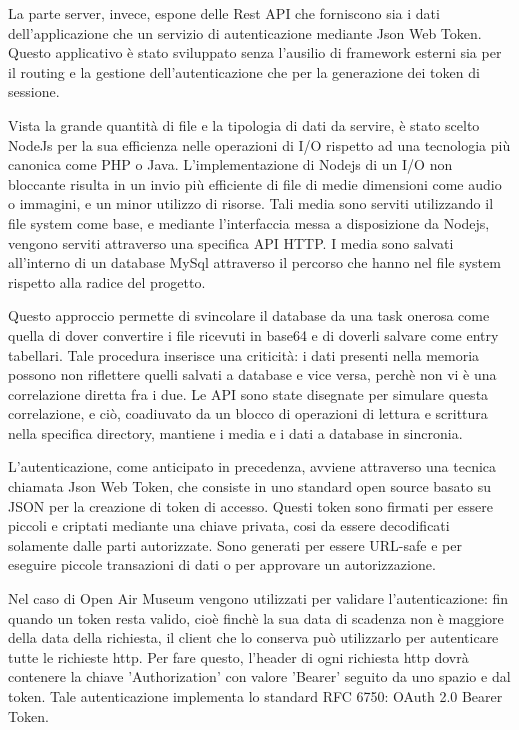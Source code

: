 La parte server, invece, espone delle Rest API che forniscono sia i dati dell'applicazione che un servizio di autenticazione mediante Json Web Token\cite{JWT}. Questo applicativo è stato sviluppato senza l’ausilio di framework esterni sia per il routing e la gestione dell’autenticazione che per la generazione dei token di sessione.\vspace{5mm}

 Vista la grande quantità di file e la tipologia di dati da servire, è stato scelto NodeJs per la sua efficienza nelle operazioni di I/O rispetto ad una tecnologia più canonica come PHP\cite{PHP} o Java\cite{Java}. L'implementazione di Nodejs di un I/O non bloccante\cite{BlockingVsNonBlocking} risulta in un invio più efficiente di file di medie dimensioni come audio o immagini, e un minor utilizzo di risorse. Tali media sono serviti utilizzando il file system come base, e mediante l'interfaccia messa a disposizione da Nodejs, vengono serviti attraverso una specifica API HTTP\cite{http}. I media sono salvati all'interno di un database MySql attraverso il percorso che hanno nel file system rispetto alla radice del progetto.\vspace{5mm}
 
  Questo approccio permette di svincolare il database da una task onerosa come quella di dover convertire i file ricevuti in base64 e di doverli salvare come entry tabellari. Tale procedura inserisce una criticità: i dati presenti nella memoria possono non riflettere quelli salvati a database e vice versa, perchè non vi è una correlazione diretta fra i due. Le API sono state disegnate per simulare questa correlazione, e ciò, coadiuvato da un blocco di operazioni di lettura e scrittura nella specifica directory, mantiene i media e i dati a database in sincronia. \vspace{5mm}

L'autenticazione, come anticipato in precedenza, avviene attraverso una tecnica chiamata Json Web Token\cite{JWT}, che consiste in uno standard open source basato su JSON per la creazione di token di accesso. Questi token sono firmati per essere piccoli e criptati mediante una chiave privata, cosi da essere decodificati solamente dalle parti autorizzate. Sono generati per essere URL-safe e per eseguire piccole transazioni di dati o per approvare un autorizzazione.  \vspace{5mm}

Nel caso di Open Air Museum vengono utilizzati per validare l'autenticazione: fin quando un token resta valido, cioè finchè la sua data di scadenza non è maggiore della data della richiesta, il client che lo conserva può utilizzarlo per autenticare tutte le richieste http. Per fare questo, l'header di ogni richiesta http dovrà contenere la chiave 'Authorization' con valore 'Bearer' seguito da uno spazio e dal token. Tale autenticazione implementa lo standard RFC 6750: OAuth 2.0 Bearer Token\cite{Bearer}.


